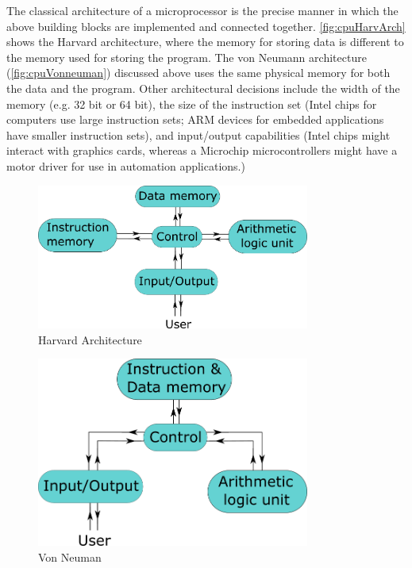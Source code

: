 The classical architecture of a microprocessor is the precise manner in which the above building blocks are implemented and connected together. \autoref{fig:cpuHarvArch} shows the Harvard architecture, where the memory for storing data is different to the memory used for storing the program. The von Neumann architecture (\autoref{fig:cpuVonneuman}) discussed above uses the same physical memory for both the data and the program. Other architectural decisions include the width of the memory (e.g. 32 bit or 64 bit), the size of the instruction set (Intel chips for computers use large instruction sets; ARM devices for embedded applications have smaller instruction sets), and input/output capabilities (Intel chips might interact with graphics cards, whereas a Microchip microcontrollers might have a motor driver for use in automation applications.)

\begin{figure}[H]
    \centering
    \includegraphics[width=0.8\textwidth]{figures/impl/Harvard_architecture.png}
    \caption{Harvard Architecture}
    \label{fig:cpuHarvArch}
\end{figure}

\begin{figure}[H]
\centering
\includegraphics[width=0.8\textwidth]{figures/impl/Von_neumann_architecutre.png}
\caption{Von Neuman}
\label{fig:cpuVonneuman}
\end{figure}

